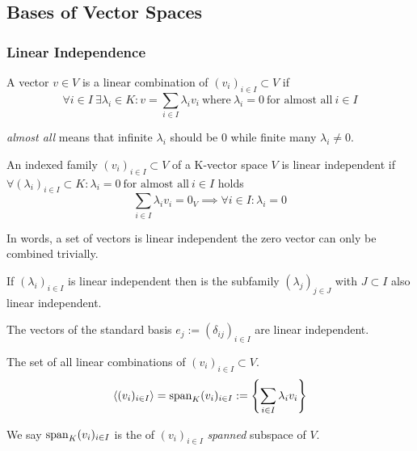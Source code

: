 \subsection{Bases of Vector Spaces}
\subsubsection{Linear Independence}
\begin{definition}\label{def:lin_comb}
   A vector \(v \in V\) is a linear combination of \((v_i)_{i \in I} \subset V\) if
   \[\forall i \in I~\exists \lambda_i \in K: v = \sum_{i \in I} \lambda_i v_i~\text{where}~\lambda_i = 0~\text{for almost all}~i \in I\]
\end{definition}
\begin{remark}
   \textit{almost all} means that infinite \(\lambda_i\) should be 0 while finite many \(\lambda_i \neq 0\).
\end{remark}

\begin{definition}\label{def:lin_depend}
   An indexed family \((v_i)_{i \in I} \subset V\) of a K-vector space \(V\) is linear independent if \(\forall (\lambda_i)_{i \in I} \subset K: \lambda_i = 0~\text{for almost all}~i \in I\) holds
   \[\sum_{i \in I} \lambda_i v_i = 0_V \implies \forall i \in I: \lambda_i = 0\]
\end{definition}
\begin{remark}
   In words, a set of vectors is linear independent the zero vector can only be combined trivially.

   If \((\lambda_i)_{i \in I}\) is linear independent then is the subfamily \((\lambda_j)_{j \in J}\) with \(J \subset I\) also linear independent.
\end{remark}
\begin{example}
   The vectors of the standard basis \(e_j := (\delta_{ij})_{i \in I}\) are linear independent.
\end{example}

\begin{definition}[Span]
   The set of all linear combinations of \((v_i)_{i \in I} \subset V\).
   \[\langle (v_i)_{i \in I} \rangle = \operatorname{span}_{K}(v_i)_{i \in I} := \left\{\sum_{i \in I} \lambda_i v_i \right\}\]
\end{definition}
\begin{remark}
   We say \(\operatorname{span}_{K}(v_i)_{i \in I}\) is the of \((v_i)_{i \in I}\) \textit{spanned} subspace of \(V\).
\end{remark}

